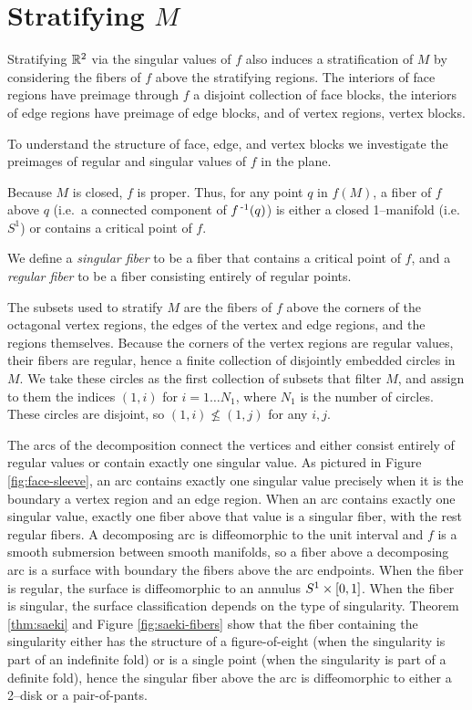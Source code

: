 \section{Stratifying $M$}

Stratifying $\mathbb{R}^2$ via the singular values of $f$ also induces a stratification of $M$
by considering the fibers of $f$ above the stratifying regions.
The interiors of face regions have preimage through $f$ a disjoint collection of face blocks, the interiors of edge regions have preimage of edge blocks, and of vertex regions, vertex blocks.

To understand the structure of face, edge, and vertex blocks we investigate the preimages of regular and singular values of $f$ in the plane.
\begin{defn}
	Because $M$ is closed, $f$ is proper.
	Thus, for any point $q$ in $f(M)$, a fiber of $f$ above $q$ (i.e.\ a connected component of $f^{\,\text{-}1}(q)$) is either a closed 1--manifold (i.e.\ $S^1$) or contains a critical point of $f$.
	
	We define a \emph{singular fiber} to be a fiber that contains a critical point of $f$, and a \emph{regular fiber} to be a fiber consisting entirely of regular points.	
\end{defn}

The subsets used to stratify $M$ are the fibers of $f$ above the corners of the octagonal vertex regions, the edges of the vertex and edge regions, and the regions themselves.
Because the corners of the vertex regions are regular values, their fibers are regular, hence a finite collection of disjointly embedded circles in $M$.
We take these circles as the first collection of subsets that filter $M$, and assign to them the indices $(1,i)$ for $i = 1\dots N_1$, where $N_1$ is the number of circles.
These circles are disjoint, so $(1,i)\nleq (1,j)$ for any $i,j$.

The arcs of the decomposition connect the vertices and either consist entirely of regular values or contain exactly one singular value.
As pictured in Figure \ref{fig:face-sleeve}, an arc contains exactly one singular value precisely when it is the boundary a vertex region and an edge region.
When an arc contains exactly one singular value, exactly one fiber above that value is a singular fiber, with the rest regular fibers.
A decomposing arc is diffeomorphic to the unit interval and $f$ is a smooth submersion between smooth manifolds, so a fiber above a decomposing arc is a surface with boundary the fibers above the arc endpoints.
When the fiber is regular, the surface is diffeomorphic to an annulus $S^1\times[0,1]$.
When the fiber is singular, the surface classification depends on the type of singularity.
Theorem \ref{thm:saeki} and Figure \ref{fig:saeki-fibers} show that the fiber containing the singularity either has the structure of a figure-of-eight (when the singularity is part of an indefinite fold) or is a single point (when the singularity is part of a definite fold), hence the singular fiber above the arc is diffeomorphic to either a 2--disk or a pair-of-pants.

